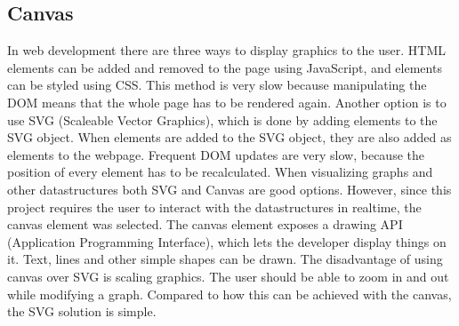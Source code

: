 \subsection{Canvas}
In web development there are three ways to display graphics to the user. HTML elements can be added and removed to the page using JavaScript, and elements can be styled using CSS. This method is very slow because manipulating the DOM means that the whole page has to be rendered again. Another option is to use SVG (Scaleable Vector Graphics)\cite{SVG:Info}, which is done by adding elements to the SVG object. When elements are added to the SVG object, they are also added as elements to the webpage. Frequent DOM updates are very slow, because the position of every element has to be recalculated. When visualizing graphs and other datastructures both SVG and Canvas\cite{Canvas:Info} are good options. However, since this project requires the user to interact with the datastructures in realtime, the canvas element was selected. The canvas element exposes a drawing API (Application Programming Interface), which lets the developer display things on it. Text, lines and other simple shapes can be drawn. The disadvantage of using canvas over SVG is scaling graphics. The user should be able to zoom in and out while modifying a graph. Compared to how this can be achieved with the canvas, the SVG solution is simple.